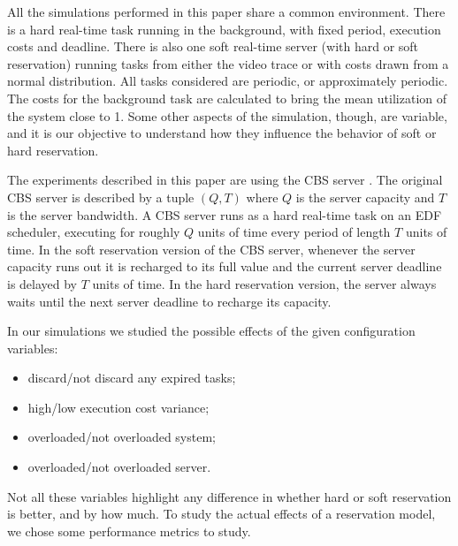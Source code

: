 \documentclass[times, 10pt,twocolumn]{article}
\begin{document}
All the simulations performed in this paper share a common
environment. There is a hard real-time task running in the background,
with fixed period, execution costs and deadline. There is also one
soft real-time server (with hard or soft reservation) running tasks
from either the video trace or with costs drawn from a normal
distribution. All tasks considered are periodic, or approximately
periodic. The costs for the background task are calculated to bring
the mean utilization of the system close to 1. Some other aspects of
the simulation, though, are variable, and it is our objective to
understand how they influence the behavior of soft or hard
reservation.

\label{sec:reserv-mech}

The experiments described in this paper are using the CBS server
\cite{abeni.ea98:integrating}. The original CBS server is described by
a tuple $(Q,T)$ where $Q$ is the server capacity and $T$ is the server
bandwidth. A CBS server runs as a hard real-time task on an EDF
scheduler, executing for roughly $Q$ units of time every period of
length $T$ units of time. In the soft reservation version of the CBS
server, whenever the server capacity runs out it is recharged to its
full value and the current server deadline is delayed by $T$ units of
time. In the hard reservation version, the server always waits until
the next server deadline to recharge its capacity.

\label{sec:controled-variables}

In our simulations we studied the possible effects of the given
configuration variables:
\begin{itemize}
\item discard/not discard any expired tasks;
\item high/low execution cost variance;
\item overloaded/not overloaded system;
\item overloaded/not overloaded server.
\end{itemize}

Not all these variables highlight any difference in whether hard or
soft reservation is better, and by how much. To study the actual
effects of a reservation model, we chose some performance metrics to study.

\label{sec:metrics}
\end{document}
